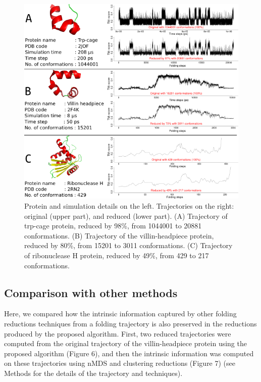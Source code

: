 \documentclass[american,twocolumn]{bmcart}
\begin{document}
\begin{figure}[!t]
\begin{raggedright}
\includegraphics{images/path-comparisons}
\par\end{raggedright}
\caption{ Protein and simulation details on the left. Trajectories on the right: original (upper part), and reduced (lower part). (A) Trajectory of trp-cage protein,  reduced by 98\%, from 1044001 to 20881 conformations. (B) Trajectory of the villin-headpiece protein, reduced by 80\%, from 15201 to 3011 conformations. (C) Trajectory of ribonuclease H protein, reduced by 49\%, from 429 to 217 conformations.\label{fig:Trajectory-Results}}
\end{figure}


\subsection*{Comparison with other methods \label{sec:Comparing-other-methods}}

Here, we compared how the intrinsic information captured by other folding reductions techniques from a folding trajectory is also preserved in the reductions produced by the proposed algorithm. First, two reduced trajectories were computed from the original trajectory of the villin-headpiece protein using the proposed algorithm (Figure 6), and then the intrinsic information was computed on these trajectories using nMDS and clustering reductions (Figure 7) (see Methods for the details of the trajectory and techniques). 
\end{document}

